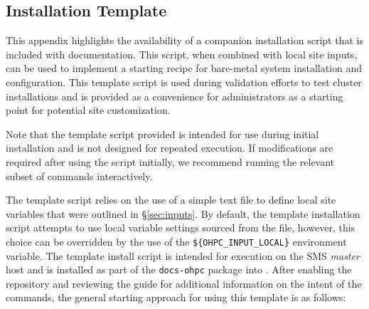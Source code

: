 \subsection{Installation Template}  \label{appendix:template_script}

This appendix highlights the availability of a companion installation script
that is included with \OHPC{} documentation. This script, when combined with
local site inputs, can be used to implement a starting recipe for
bare-metal system installation and configuration. This template script is used
during validation efforts to test cluster installations and is provided as a
convenience for administrators as a starting point for potential site
customization. 

\vspace*{0.1cm}

\begin{center}
\begin{tcolorbox}[]
\small Note that the template script provided is intended for use during
initial installation and is not designed for repeated execution.  If
modifications are required after using the script initially, we recommend
running the relevant subset of commands interactively.
\end{tcolorbox}
\end{center}

The template script relies on the use of a simple text file to define local
site variables that were outlined in \S\ref{sec:inputs}. By default, the
template installation script attempts to use local variable settings sourced from
the  file, however, this
choice can be overridden by the use of the \texttt{\$\{OHPC\_INPUT\_LOCAL\}}
environment variable. The template install script is intended for execution on
the SMS {\em master} host and is installed as part of the \texttt{docs-ohpc}
package into . After
enabling the \OHPC{} repository and reviewing the guide for additional
information on the intent of the commands, the general starting approach for
using this template is as follows:

